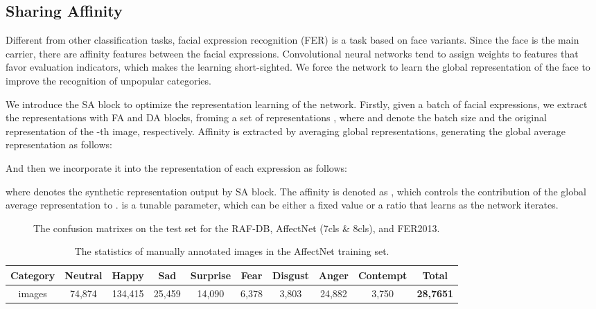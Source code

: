\documentclass[10pt,twocolumn,letterpaper]{article}
\begin{document}
\subsection{Sharing Affinity}
Different from other classification tasks, facial expression recognition (FER) is a task based on face variants. Since the face is the main carrier, there are affinity features between the facial expressions. Convolutional neural networks tend to assign weights to features that favor evaluation indicators, which makes the learning short-sighted. We force the network to learn the global representation of the face to improve the recognition of unpopular categories.

	We introduce the SA block to optimize the representation learning of the network. Firstly, given a batch of facial expressions, we extract the representations with FA and DA blocks, froming a set of representations , where 	and  denote the batch size and the original representation of the -th image, respectively. Affinity is extracted by averaging global representations, generating the global average representation  as follows:

 And then we incorporate it into the representation of each expression as follows:

where  denotes the synthetic representation output by SA block. The affinity is denoted as , which controls the contribution of the global average representation  to .  is a tunable parameter, which can be either a fixed value or a ratio that learns as the network iterates.


\begin{figure*}[t]
\begin{center}


\centering
	\hspace{-5mm}
	\hspace{-5mm}
	\caption{The confusion matrixes on the test set for the RAF-DB, AffectNet (7cls \& 8cls), and FER2013.}
\label{fig:fusion}

\end{center}
\end{figure*}

\begin{table*}[t]
\begin{center}
\begin{tabular}{cccccccccc}
\toprule
	Category & Neutral & Happy & Sad & Surprise & Fear & Disgust & Anger & Contempt & Total\\
	\midrule
	images & 74,874 & 134,415& 25,459& 14,090& 6,378& 3,803& 24,882& 3,750& \textbf{28,7651} \\
\bottomrule
\end{tabular}
\end{center}
\caption{The statistics of manually annotated images in the AffectNet training set.}
\label{tab:affectnet}
\end{table*}
\end{document}
